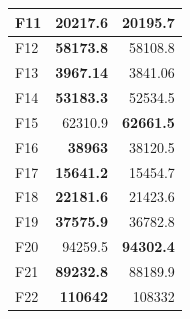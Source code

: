 \begin{table}[]
\begin{tabular}{l|r|r|}
\multicolumn{1}{|l|}{\cellcolor[HTML]{FCE6AB}F11}  & \cellcolor[HTML]{D3FFB6}\textbf{20217.6}                 & 20195.7                                                   \\ \hline
\multicolumn{1}{|l|}{\cellcolor[HTML]{FCE6AB}F12}  & \cellcolor[HTML]{D3FFB6}\textbf{58173.8}                 & 58108.8                                                   \\ \hline
\multicolumn{1}{|l|}{\cellcolor[HTML]{FCE6AB}F13}  & \cellcolor[HTML]{D3FFB6}\textbf{3967.14}                 & 3841.06                                                   \\ \hline
\multicolumn{1}{|l|}{\cellcolor[HTML]{FCE6AB}F14}  & \cellcolor[HTML]{D3FFB6}\textbf{53183.3}                 & 52534.5                                                   \\ \hline
\multicolumn{1}{|l|}{\cellcolor[HTML]{FCE6AB}F15}  & 62310.9                                                  & \cellcolor[HTML]{D3FFB6}\textbf{62661.5}                  \\ \hline
\multicolumn{1}{|l|}{\cellcolor[HTML]{FCE6AB}F16}  & \cellcolor[HTML]{D3FFB6}\textbf{38963}                   & 38120.5                                                   \\ \hline
\multicolumn{1}{|l|}{\cellcolor[HTML]{FCE6AB}F17}  & \cellcolor[HTML]{D3FFB6}\textbf{15641.2}                 & 15454.7                                                   \\ \hline
\multicolumn{1}{|l|}{\cellcolor[HTML]{FCE6AB}F18}  & \cellcolor[HTML]{D3FFB6}\textbf{22181.6}                 & 21423.6                                                   \\ \hline
\multicolumn{1}{|l|}{\cellcolor[HTML]{FCE6AB}F19}  & \cellcolor[HTML]{D3FFB6}\textbf{37575.9}                 & 36782.8                                                   \\ \hline
\multicolumn{1}{|l|}{\cellcolor[HTML]{FCE6AB}F20}  & 94259.5                                                  & \cellcolor[HTML]{D3FFB6}\textbf{94302.4}                  \\ \hline
\multicolumn{1}{|l|}{\cellcolor[HTML]{FCE6AB}F21}  & \cellcolor[HTML]{D3FFB6}\textbf{89232.8}                 & 88189.9                                                   \\ \hline
\multicolumn{1}{|l|}{\cellcolor[HTML]{FCE6AB}F22}  & \cellcolor[HTML]{D3FFB6}\textbf{110642}                  & 108332                                                    \\ \hline

\end{tabular}
\end{table}

